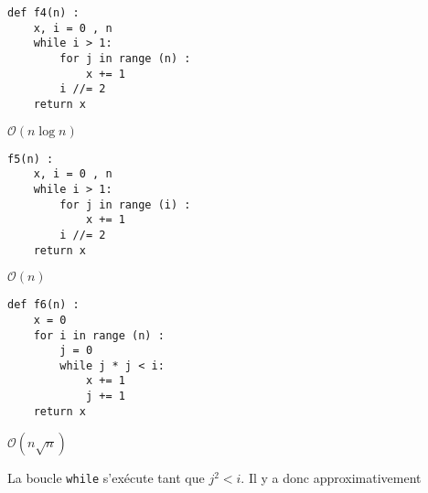 \begin{lstlisting}
def f4(n) :
    x, i = 0 , n
    while i > 1:
        for j in range (n) :
            x += 1
        i //= 2
    return x
\end{lstlisting}
\ifprof
\begin{corrige}
$\mathcal{O}(n \log n)$
\end{corrige}
\else
\fi



\begin{lstlisting}
f5(n) :
    x, i = 0 , n
    while i > 1:
        for j in range (i) :
            x += 1
        i //= 2
    return x
\end{lstlisting}
\ifprof
\begin{corrige}
$\mathcal{O}( n)$
\end{corrige}
\else
\fi



\begin{lstlisting}
def f6(n) :
    x = 0
    for i in range (n) :
        j = 0
        while j * j < i:
            x += 1
            j += 1
    return x
\end{lstlisting}
\ifprof
\begin{corrige}
$\mathcal{O}( n\sqrt{n})$


La boucle \lstinline{while} s'exécute tant que $j^2<i$. Il y a donc approximativement 
\end{corrige}
\else

\fi

